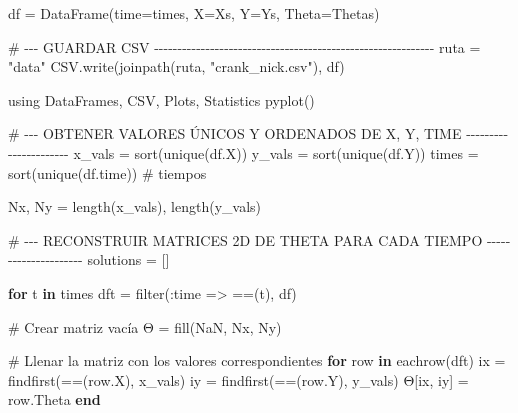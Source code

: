 \documentclass[
  spanish,
  us-letterpaper,
  DIV=11,
  numbers=noendperiod]{scrreprt}
\newenvironment{Shaded}{\begin{snugshade}}{\end{snugshade}}
\newcommand{\BuiltInTok}[1]{\textcolor[rgb]{0.00,0.23,0.31}{#1}}
\newcommand{\CommentTok}[1]{\textcolor[rgb]{0.37,0.37,0.37}{#1}}
\newcommand{\ConstantTok}[1]{\textcolor[rgb]{0.56,0.35,0.01}{#1}}
\newcommand{\ControlFlowTok}[1]{\textcolor[rgb]{0.00,0.23,0.31}{\textbf{#1}}}
\newcommand{\FunctionTok}[1]{\textcolor[rgb]{0.28,0.35,0.67}{#1}}
\newcommand{\ImportTok}[1]{\textcolor[rgb]{0.00,0.46,0.62}{#1}}
\newcommand{\KeywordTok}[1]{\textcolor[rgb]{0.00,0.23,0.31}{\textbf{#1}}}
\newcommand{\NormalTok}[1]{\textcolor[rgb]{0.00,0.23,0.31}{#1}}
\newcommand{\OperatorTok}[1]{\textcolor[rgb]{0.37,0.37,0.37}{#1}}
\newcommand{\StringTok}[1]{\textcolor[rgb]{0.13,0.47,0.30}{#1}}
\theoremstyle{definition}
\theoremstyle{plain}
\theoremstyle{remark}
\begin{document}
\begin{Shaded}
\begin{Highlighting}[]
\NormalTok{df }\OperatorTok{=} \FunctionTok{DataFrame}\NormalTok{(time}\OperatorTok{=}\NormalTok{times, X}\OperatorTok{=}\NormalTok{Xs, Y}\OperatorTok{=}\NormalTok{Ys, Theta}\OperatorTok{=}\NormalTok{Thetas)}

\CommentTok{\# {-}{-}{-} GUARDAR CSV {-}{-}{-}{-}{-}{-}{-}{-}{-}{-}{-}{-}{-}{-}{-}{-}{-}{-}{-}{-}{-}{-}{-}{-}{-}{-}{-}{-}{-}{-}{-}{-}{-}{-}{-}{-}{-}{-}{-}{-}{-}{-}{-}{-}{-}{-}{-}{-}{-}{-}{-}{-}{-}{-}{-}{-}{-}{-}{-}{-}}
\NormalTok{ruta }\OperatorTok{=} \StringTok{"data"}
\NormalTok{CSV.}\FunctionTok{write}\NormalTok{(}\FunctionTok{joinpath}\NormalTok{(ruta, }\StringTok{"crank\_nick.csv"}\NormalTok{), df)}
\end{Highlighting}
\end{Shaded}

\begin{Shaded}
\begin{Highlighting}[]
\ImportTok{using} \BuiltInTok{DataFrames}\NormalTok{, }\BuiltInTok{CSV}\NormalTok{, }\BuiltInTok{Plots}\NormalTok{, }\BuiltInTok{Statistics}
\FunctionTok{pyplot}\NormalTok{()}

\CommentTok{\# {-}{-}{-} OBTENER VALORES ÚNICOS Y ORDENADOS DE X, Y, TIME {-}{-}{-}{-}{-}{-}{-}{-}{-}{-}{-}{-}{-}{-}{-}{-}{-}{-}{-}{-}{-}{-}}
\NormalTok{x\_vals }\OperatorTok{=} \FunctionTok{sort}\NormalTok{(}\FunctionTok{unique}\NormalTok{(df.X))}
\NormalTok{y\_vals }\OperatorTok{=} \FunctionTok{sort}\NormalTok{(}\FunctionTok{unique}\NormalTok{(df.Y))}
\NormalTok{times }\OperatorTok{=} \FunctionTok{sort}\NormalTok{(}\FunctionTok{unique}\NormalTok{(df.time))  }\CommentTok{\# tiempos}

\NormalTok{Nx, Ny }\OperatorTok{=} \FunctionTok{length}\NormalTok{(x\_vals), }\FunctionTok{length}\NormalTok{(y\_vals)}

\CommentTok{\# {-}{-}{-} RECONSTRUIR MATRICES 2D DE THETA PARA CADA TIEMPO {-}{-}{-}{-}{-}{-}{-}{-}{-}{-}{-}{-}{-}{-}{-}{-}{-}{-}{-}{-}{-}}
\NormalTok{solutions }\OperatorTok{=}\NormalTok{ []}

\ControlFlowTok{for}\NormalTok{ t }\KeywordTok{in}\NormalTok{ times}
\NormalTok{    dft }\OperatorTok{=} \FunctionTok{filter}\NormalTok{(}\OperatorTok{:}\NormalTok{time }\OperatorTok{=\textgreater{}} \OperatorTok{==}\NormalTok{(t), df)}

    \CommentTok{\# Crear matriz vacía}
\NormalTok{    Θ }\OperatorTok{=} \FunctionTok{fill}\NormalTok{(}\ConstantTok{NaN}\NormalTok{, Nx, Ny)}

    \CommentTok{\# Llenar la matriz con los valores correspondientes}
    \ControlFlowTok{for}\NormalTok{ row }\KeywordTok{in} \FunctionTok{eachrow}\NormalTok{(dft)}
\NormalTok{        ix }\OperatorTok{=} \FunctionTok{findfirst}\NormalTok{(}\OperatorTok{==}\NormalTok{(row.X), x\_vals)}
\NormalTok{        iy }\OperatorTok{=} \FunctionTok{findfirst}\NormalTok{(}\OperatorTok{==}\NormalTok{(row.Y), y\_vals)}
\NormalTok{        Θ[ix, iy] }\OperatorTok{=}\NormalTok{ row.Theta}
    \ControlFlowTok{end}


\end{Highlighting}
\end{Shaded}
\end{document}
